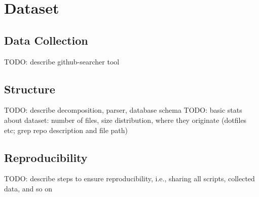 \section{Dataset}

\subsection{Data Collection}

TODO: describe github-searcher tool

\subsection{Structure}
TODO: describe decomposition, parser, database schema
TODO: basic stats about dataset: number of files, size distribution, where they originate (dotfiles etc; grep repo description and file path)

\subsection{Reproducibility}

TODO: describe steps to ensure reproducibility, i.e., sharing all scripts, collected data, and so on
